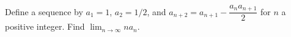 Define a sequence by $a_1 = 1$, $a_2 = 1/2$, and $a_{n+2} = a_{n+1} -
\dfrac{a_n a_{n+1}}{2}$ for $n$ a positive integer. Find $\displaystyle \lim_{n
\to \infty} n a_n$.
